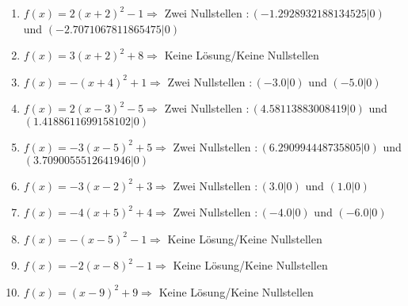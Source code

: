 \documentclass{article}%
\begin{document}
\begin{enumerate}[label=\alph*)]
\item%
\newline\vspace{0.5cm}$f(x)=2(x+2)^2 -1 \Rightarrow $ Zwei Nullstellen $: (-1.2928932188134525|0) $ und $ (-2.7071067811865475|0) $%
\item%
\newline\vspace{0.5cm}$f(x)=3(x+2)^2 +8 \Rightarrow  $ Keine Lösung/Keine Nullstellen $ $%
\item%
\newline\vspace{0.5cm}$f(x)=-(x+4)^2 +1 \Rightarrow $ Zwei Nullstellen $: (-3.0|0) $ und $ (-5.0|0) $%
\item%
\newline\vspace{0.5cm}$f(x)=2(x-3)^2 -5 \Rightarrow $ Zwei Nullstellen $: (4.58113883008419|0) $ und $ (1.4188611699158102|0) $%
\item%
\newline\vspace{0.5cm}$f(x)=-3(x-5)^2 +5 \Rightarrow $ Zwei Nullstellen $: (6.290994448735805|0) $ und $ (3.7090055512641946|0) $%
\item%
\newline\vspace{0.5cm}$f(x)=-3(x-2)^2 +3 \Rightarrow $ Zwei Nullstellen $: (3.0|0) $ und $ (1.0|0) $%
\item%
\newline\vspace{0.5cm}$f(x)=-4(x+5)^2 +4 \Rightarrow $ Zwei Nullstellen $: (-4.0|0) $ und $ (-6.0|0) $%
\item%
\newline\vspace{0.5cm}$f(x)=-(x-5)^2 -1 \Rightarrow  $ Keine Lösung/Keine Nullstellen $ $%
\item%
\newline\vspace{0.5cm}$f(x)=-2(x-8)^2 -1 \Rightarrow  $ Keine Lösung/Keine Nullstellen $ $%
\item%
\newline\vspace{0.5cm}$f(x)=(x-9)^2 +9 \Rightarrow  $ Keine Lösung/Keine Nullstellen $ $%
\end{enumerate}

%
\end{document}
